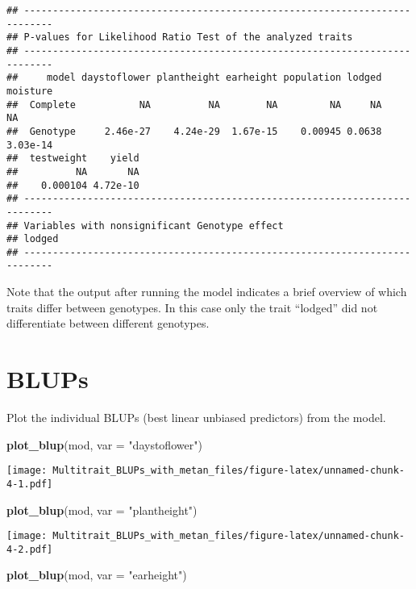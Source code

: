 \documentclass[
]{article}
\newenvironment{Shaded}{\begin{snugshade}}{\end{snugshade}}
\newcommand{\AttributeTok}[1]{\textcolor[rgb]{0.13,0.29,0.53}{#1}}
\newcommand{\FunctionTok}[1]{\textcolor[rgb]{0.13,0.29,0.53}{\textbf{#1}}}
\newcommand{\NormalTok}[1]{#1}
\newcommand{\StringTok}[1]{\textcolor[rgb]{0.31,0.60,0.02}{#1}}
\begin{document}
\begin{verbatim}
## ---------------------------------------------------------------------------
## P-values for Likelihood Ratio Test of the analyzed traits
## ---------------------------------------------------------------------------
##     model daystoflower plantheight earheight population lodged moisture
##  Complete           NA          NA        NA         NA     NA       NA
##  Genotype     2.46e-27    4.24e-29  1.67e-15    0.00945 0.0638 3.03e-14
##  testweight    yield
##          NA       NA
##    0.000104 4.72e-10
## ---------------------------------------------------------------------------
## Variables with nonsignificant Genotype effect
## lodged 
## ---------------------------------------------------------------------------
\end{verbatim}

Note that the output after running the model indicates a brief overview
of which traits differ between genotypes. In this case only the trait
``lodged'' did not differentiate between different genotypes.

\section{BLUPs}\label{blups}

Plot the individual BLUPs (best linear unbiased predictors) from the
model.

\begin{Shaded}
\begin{Highlighting}[]
\FunctionTok{plot\_blup}\NormalTok{(mod, }\AttributeTok{var =} \StringTok{"daystoflower"}\NormalTok{)}
\end{Highlighting}
\end{Shaded}

\texttt{[image: Multitrait\_BLUPs\_with\_metan\_files/figure-latex/unnamed-chunk-4-1.pdf]}

\begin{Shaded}
\begin{Highlighting}[]
\FunctionTok{plot\_blup}\NormalTok{(mod, }\AttributeTok{var =} \StringTok{"plantheight"}\NormalTok{)}
\end{Highlighting}
\end{Shaded}

\texttt{[image: Multitrait\_BLUPs\_with\_metan\_files/figure-latex/unnamed-chunk-4-2.pdf]}

\begin{Shaded}
\begin{Highlighting}[]
\FunctionTok{plot\_blup}\NormalTok{(mod, }\AttributeTok{var =} \StringTok{"earheight"}\NormalTok{)}
\end{Highlighting}
\end{Shaded}
\end{document}
